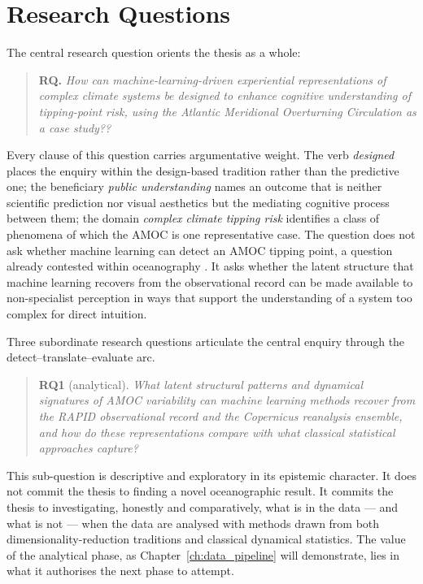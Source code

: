 \section{Research Questions}
\label{sec:rqs}

The central research question orients the thesis as a whole:

\begin{quote}
\textbf{RQ.} \emph{How can machine-learning-driven experiential representations of complex climate systems be designed to enhance cognitive understanding of tipping-point risk, using the Atlantic Meridional Overturning Circulation as a case study??}
\end{quote}

Every clause of this question carries argumentative weight. The verb \emph{designed} places the enquiry within the design-based tradition rather than the predictive one; the beneficiary \emph{public understanding} names an outcome that is neither scientific prediction nor visual aesthetics but the mediating cognitive process between them; the domain \emph{complex climate tipping risk} identifies a class of phenomena of which the AMOC is one representative case. The question does not ask whether machine learning can detect an AMOC tipping point, a question already contested within oceanography \citep{ditlevsen2023, benyami2024}. It asks whether the latent structure that machine learning recovers from the observational record can be made available to non-specialist perception in ways that support the understanding of a system too complex for direct intuition.

Three subordinate research questions articulate the central enquiry through the detect–translate–evaluate arc. 

\begin{quote}
\textbf{RQ1} (analytical). \emph{What latent structural patterns and dynamical signatures of AMOC variability can machine learning methods recover from the RAPID observational record and the Copernicus reanalysis ensemble, and how do these representations compare with what classical statistical approaches capture?}
\end{quote}

This sub-question is descriptive and exploratory in its epistemic character. It does not commit the thesis to finding a novel oceanographic result. It commits the thesis to investigating, honestly and comparatively, what is in the data --- and what is not --- when the data are analysed with methods drawn from both dimensionality-reduction traditions and classical dynamical statistics. The value of the analytical phase, as Chapter~\ref{ch:data_pipeline} will demonstrate, lies in what it authorises the next phase to attempt.

